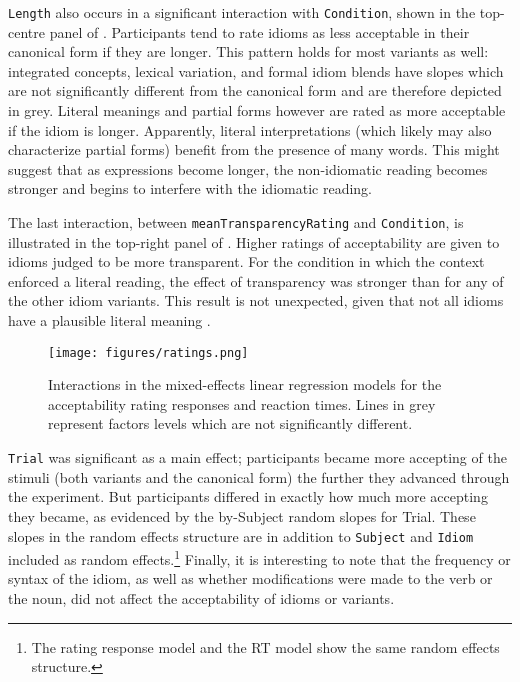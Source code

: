 \documentclass[output=paper,modfonts,nonflat]{langsci/langscibook}
\begin{document}
\texttt{Length} also occurs in a significant interaction with \texttt{Condition}, shown in the top-centre panel of . Participants tend to rate idioms as less acceptable in their canonical form if they are longer. This pattern holds for most variants as well: integrated concepts, lexical variation, and formal idiom blends have slopes which are not significantly different from the canonical form and are therefore depicted in grey. Literal meanings and partial forms however are rated as more acceptable if the idiom is longer. Apparently, literal interpretations (which likely may also characterize partial forms) benefit from the presence of many words. This might suggest that as expressions become longer, the non-idiomatic reading becomes stronger and begins to interfere with the idiomatic reading.

The last interaction, between \texttt{meanTransparencyRating} and \texttt{Condition}, is illustrated in the top-right panel of . Higher ratings of acceptability are given to idioms judged to be more transparent. For the condition in which the context enforced a literal reading, the effect of transparency was stronger than for any of the other idiom variants. This result is not unexpected, given that not all idioms have a plausible literal meaning \citep{TitoneConnine1994}. 


\begin{figure}[t]
\texttt{[image: figures/ratings.png]}
\caption{Interactions in the mixed-effects linear regression models for the acceptability rating responses and reaction times. Lines in grey represent factors levels which are not significantly different.}
\label{plotRatings}
\end{figure}

\largerpage
\texttt{Trial} was significant as a main effect; participants became more accepting of the stimuli (both variants and the canonical form) the further they advanced through the experiment. But participants differed in exactly how much more accepting they became, as evidenced by the by-Subject random slopes for Trial. 
These slopes in the random effects structure are in addition to \texttt{Subject} and \texttt{Idiom} included as random effects.\footnote{The rating response model and the RT model show the same random effects structure.} Finally, it is interesting to note that the frequency or syntax of the idiom, as well as whether modifications were made to the verb or the noun, did not affect the acceptability of idioms or variants. 
\end{document}
